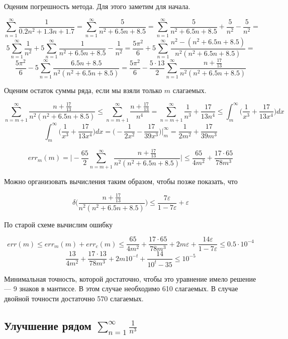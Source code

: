 \documentclass[11pt,a4paper,oneside]{article}
\begin{document}
Оценим погрешность метода. Для этого заметим для начала.

$$ \sum_{n = 1}^{\infty} \frac{1}{0.2n^2 + 1.3n + 1.7} =
	\sum_{n = 1}^{\infty} \frac{5}{n^2 + 6.5n + 8.5} =
	\sum_{n = 1}^{\infty} \frac{5}{n^2 + 6.5n + 8.5} + \frac{5}{n^2} - \frac{5}{n^2} = $$
$$ 5 \sum_{n = 1}^{\infty} \frac{1}{n^2} +
	5 \sum_{n = 1}^{\infty} \frac{1}{n^2 + 6.5n + 8.5} - \frac{1}{n^2} = 
	\frac{5\pi^2}{6} +
	5 \sum_{n = 1}^{\infty} \frac{n^2 - (n^2 + 6.5n + 8.5)}{n^2 (n^2 + 6.5n + 8.5)} = $$
$$ \frac{5\pi^2}{6} -
	5 \sum_{n = 1}^{\infty} \frac{6.5n + 8.5}{n^2 (n^2 + 6.5n + 8.5)} = 
	\frac{5\pi^2}{6} -
	\frac{5 \cdot 13}{2} \sum_{n = 1}^{\infty} \frac{n + \frac{17}{13}}{n^2 (n^2 + 6.5n + 8.5)}$$
	
Оценим остаток суммы ряда, если мы взяли только $m$ слагаемых.

$$ \sum_{n = m + 1}^{\infty} \frac{n + \frac{17}{13}}{n^2 (n^2 + 6.5n + 8.5)} \le
	\sum_{n = m + 1}^{\infty} \frac{n + \frac{17}{13}}{n^4} = 
	\sum_{n = m + 1}^{\infty} \frac{1}{n^3} + \frac{17}{13 n^4} \le
	\int_{m}^{\infty} \biggr(\frac{1}{x^3} + \frac{17}{13 x^4}\biggr)dx $$
$$ \int_{m}^{\infty} \biggr(\frac{1}{x^3} + \frac{17}{13 x^4}\biggr) dx
	= \biggr( - \frac{1}{2x^2} - \frac{17}{39 x^3} \biggr) \biggr|_{m}^{\infty} =
	\frac{1}{2 m^2} + \frac{17}{39 m^3} $$
	
$$ err_{m}(m) =
	\biggr|-\frac{65}{2} \sum_{n = m + 1}^{\infty}
		\frac{n + \frac{17}{13}}{n^2 (n^2 + 6.5n + 8.5)}\biggr| \le
	\frac{65}{4m^2} + \frac{17 \cdot 65}{78m^3}$$
	
Можно организовать вычисления таким образом, чтобы позже показать, что

$$ \delta \biggr( \frac{n + \frac{17}{13}}{n^2 (n^2 + 6.5n + 8.5)} \biggr)
	\le \frac{7 \varepsilon}{1 - 7 \varepsilon} + \varepsilon $$
	
По старой схеме вычислим ошибку
	
$$ err(m) \le err_{m}(m) + err_{c}(m)
	\le \frac{65}{4m^2} + \frac{17 \cdot 65}{78m^3}
		+ 2 m \varepsilon + \frac{14 \varepsilon}{1 - 7 \varepsilon}
	\le 0.5 \cdot 10^{-4} $$
$$ \frac{13}{4m^2} + \frac{17 \cdot 13}{78m^3}
		+ 2 m 10^{-t} + \frac{14}{10^{t} - 35} \le 10^{-5} $$

Минимальная точность, которой достаточно, чтобы это уравнение имело решение --- 9 знаков в мантиссе. В этом случае необходимо 610 слагаемых. В случае двойной точности достаточно 570 слагаемых.
	
\subsection{Улучшение рядом $ \sum_{n = 1}^{\infty} \frac{1}{n^3} $}
	
\end{document}

